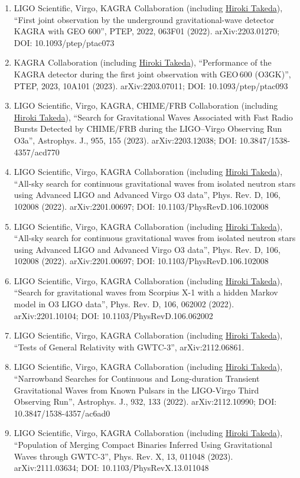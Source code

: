 \documentclass[uplatex, 12pt]{article}
\begin{document}
\begin{enumerate}
\item LIGO Scientific, Virgo, KAGRA Collaboration (including \uline{Hiroki Takeda}), “First joint observation by the underground gravitational-wave detector KAGRA with GEO 600”, PTEP, 2022, 063F01 (2022). arXiv:2203.01270; DOI: 10.1093/ptep/ptac073
\item KAGRA Collaboration (including \uline{Hiroki Takeda}), “Performance of the KAGRA detector during the first joint observation with GEO\,600 (O3GK)”, PTEP, 2023, 10A101 (2023). arXiv:2203.07011; DOI: 10.1093/ptep/ptac093
\item LIGO Scientific, Virgo, KAGRA, CHIME/FRB Collaboration (including \uline{Hiroki Takeda}), “Search for Gravitational Waves Associated with Fast Radio Bursts Detected by CHIME/FRB during the LIGO–Virgo Observing Run O3a”, Astrophys. J., 955, 155 (2023). arXiv:2203.12038; DOI: 10.3847/1538-4357/acd770
\item LIGO Scientific, Virgo, KAGRA Collaboration (including \uline{Hiroki Takeda}), “All-sky search for continuous gravitational waves from isolated neutron stars using Advanced LIGO and Advanced Virgo O3 data”, Phys. Rev. D, 106, 102008 (2022). arXiv:2201.00697; DOI: 10.1103/PhysRevD.106.102008
\item LIGO Scientific, Virgo, KAGRA Collaboration (including \uline{Hiroki Takeda}), “All-sky search for continuous gravitational waves from isolated neutron stars using Advanced LIGO and Advanced Virgo O3 data”, Phys. Rev. D, 106, 102008 (2022). arXiv:2201.00697; DOI: 10.1103/PhysRevD.106.102008
\item LIGO Scientific, Virgo, KAGRA Collaboration (including \uline{Hiroki Takeda}), “Search for gravitational waves from Scorpius X-1 with a hidden Markov model in O3 LIGO data”, Phys. Rev. D, 106, 062002 (2022). arXiv:2201.10104; DOI: 10.1103/PhysRevD.106.062002
\item LIGO Scientific, Virgo, KAGRA Collaboration (including \uline{Hiroki Takeda}), “Tests of General Relativity with GWTC-3”, arXiv:2112.06861.
\item LIGO Scientific, Virgo, KAGRA Collaboration (including \uline{Hiroki Takeda}), “Narrowband Searches for Continuous and Long-duration Transient Gravitational Waves from Known Pulsars in the LIGO-Virgo Third Observing Run”, Astrophys. J., 932, 133 (2022). arXiv:2112.10990; DOI: 10.3847/1538-4357/ac6ad0
\item LIGO Scientific, Virgo, KAGRA Collaboration (including \uline{Hiroki Takeda}), “Population of Merging Compact Binaries Inferred Using Gravitational Waves through GWTC-3”, Phys. Rev. X, 13, 011048 (2023). arXiv:2111.03634; DOI: 10.1103/PhysRevX.13.011048

\end{enumerate}
\end{document}
